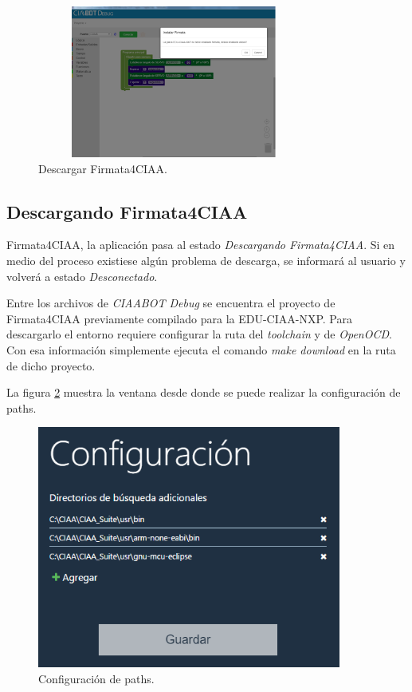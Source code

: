 \begin{figure}[!htbp]
	\begin{center}  %
		\includegraphics*[width=9cm,height=5cm]{./Figures/instalar-firmata.png}
		\par\caption{Descargar Firmata4CIAA.}\label{fig:instalar-firmata}
	\end{center}
\end{figure}

\subsection{Descargando Firmata4CIAA}
\label{subsec:Descargando Firmata4CIAA}

Firmata4CIAA, la aplicación pasa al estado \emph{Descargando Firmata4CIAA}. Si en medio del proceso existiese algún problema de descarga, se informará al usuario y volverá a estado \emph{Desconectado}.

Entre los archivos de \emph{CIAABOT Debug} se encuentra el proyecto de Firmata4CIAA previamente compilado para la EDU-CIAA-NXP. Para descargarlo el entorno requiere configurar la ruta del \emph{toolchain} y de \emph{OpenOCD}. Con esa información simplemente ejecuta el comando \emph{make download} en la ruta de dicho proyecto.

La figura \ref{fig:Configuracion} muestra la ventana desde donde se puede realizar la configuración de paths.

\begin{figure}[!htbp]
	\begin{center}  %
		\includegraphics*[width=10cm]{./Figures/Configuracion.PNG}
		\par\caption{Configuración de paths.}\label{fig:Configuracion}
	\end{center}
\end{figure}


